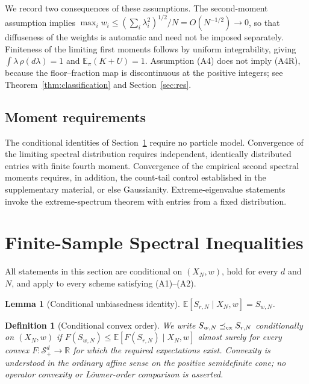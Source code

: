 \documentclass[lettersize,journal]{IEEEtran}
\newtheorem{lemma}[theo]{Lemma}
\newtheorem{defi}[theo]{Definition}
\theoremstyle{remark}
\begin{document}
We record two consequences of these assumptions. The second-moment
assumption implies $\max_iw_i\le(\sum_i\lambda_i^2)^{1/2}/N=O(N^{-1/2})\to0$,
so that diffuseness of the weights is automatic and need not be imposed
separately. Finiteness of the limiting first moments follows by uniform
integrability, giving $\int\lambda\,\rho(d\lambda)=1$ and
$\mathbb{E}_\pi(K+U)=1$. Assumption (A4) does not imply (A4R), because the
floor--fraction map is discontinuous at the positive integers; see
Theorem~\ref{thm:classification} and Section~\ref{sec:res}.

\subsection{Moment requirements}

The conditional identities of Section~\ref{sec:finite} require no particle
model. Convergence of the limiting spectral distribution requires independent,
identically distributed entries with finite fourth moment. Convergence of the
empirical second spectral moments requires, in addition, the count-tail
control established in the supplementary material, or else Gaussianity.
Extreme-eigenvalue statements invoke the extreme-spectrum theorem with entries
from a fixed distribution.

\section{Finite-Sample Spectral Inequalities}
\label{sec:finite}

All statements in this section are conditional on $(X_N,w)$, hold for every
$d$ and $N$, and apply to every scheme satisfying (A1)--(A2).

\begin{lemma}[Conditional unbiasedness identity]
\label{lem:unbiased}
$\mathbb{E}[S_{r,N}\mid X_N,w]=S_{w,N}$.
\end{lemma}

\begin{defi}[Conditional convex order\cite{voiculescu1987multiplication,bercovici1993free,rockafellar1970convex}]
\label{def:cxorder}
We write $S_{w,N}\preceq_{\rm cx}S_{r,N}$ conditionally on $(X_N,w)$ if
$F(S_{w,N})\le\mathbb{E}[F(S_{r,N})\mid X_N,w]$ almost surely for every convex
$F:\mathcal{S}_+^d\to\mathbb{R}$ for which the required expectations exist.
Convexity is understood in the ordinary affine sense on the positive
semidefinite cone; no operator convexity or L\"owner-order comparison is
asserted.
\end{defi}
\end{document}

